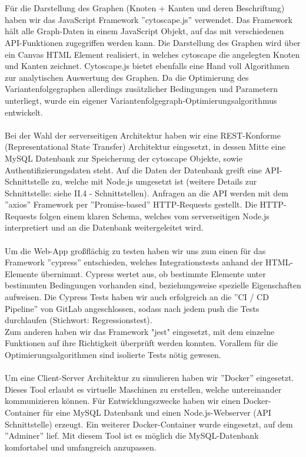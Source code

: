 \documentclass[twoside]{report}
\begin{document}
\\
\\Für die Darstellung des Graphen (Knoten + Kanten und deren Beschriftung) haben wir das JavaScript Framework ''cytoscape.js'' verwendet.
Das Framework hält alle Graph-Daten in einem JavaScript Objekt, auf das mit verschiedenen API-Funktionen zugegriffen werden kann.
Die Darstellung des Graphen wird über ein Canvas HTML Element realisiert, in welches cytoscape die angelegten Knoten und Kanten zeichnet.
Cytoscape.js bietet ebenfalls eine Hand voll Algorithmen zur analytischen Auswertung des Graphen. Da die Optimierung des Variantenfolgegraphen
allerdings zusätzlicher Bedingungen und Parametern unterliegt, wurde ein eigener Variantenfolgegraph-Optimierungsalgorithmus entwickelt.
\\
\\Bei der Wahl der serverseitigen Architektur haben wir eine REST-Konforme (Representational State Transfer)
Architektur eingesetzt, in dessen Mitte eine MySQL Datenbank zur Speicherung der cytoscape Objekte, sowie Authentifizierungsdaten
steht. Auf die Daten der Datenbank greift eine API-Schnittstelle zu, welche mit Node.js umgesetzt ist (weitere Details zur Schnittstelle:
siehe II.4 - Schnittstellen). Anfragen an die API werden mit dem ''axios'' Framework per ''Promise-based'' HTTP-Requests gestellt. Die HTTP-Requests
folgen einem klaren Schema, welches vom serverseitigen Node.js interpretiert und an die Datenbank weitergeleitet wird.
\\
\\Um die Web-App großflächig zu testen haben wir uns zum einen für das Framework ''cypress'' entschieden, welches Integrationstests anhand der
HTML-Elemente übernimmt. Cypress wertet aus, ob bestimmte Elemente unter bestimmten Bedingungen vorhanden sind, beziehungsweise spezielle 
Eigenschaften aufweisen. Die Cypress Tests haben wir auch erfolgreich an die ''CI / CD Pipeline'' von GitLab angeschlossen, sodass nach jedem
push die Tests durchlaufen (Stichwort: Regressionstest).
\\Zum anderen haben wir das Framework "jest" eingesetzt, mit dem einzelne Funktionen auf ihre Richtigkeit überprüft werden konnten. Vorallem
für die Optimierungsalgorithmen sind isolierte Tests nötig gewesen.
\\
\\Um eine Client-Server Architektur zu simulieren haben wir ''Docker'' eingesetzt. Dieses Tool erlaubt es virtuelle Maschinen zu erstellen,
welche untereinander kommunizieren können. Für Entwicklungszwecke haben wir einen Docker-Container für eine MySQL Datenbank und 
einen Node.js-Webserver (API Schnittstelle) erzeugt. Ein weiterer Docker-Container wurde eingesetzt, auf dem ''Adminer'' lief. Mit diesem 
Tool ist es möglich die MySQL-Datenbank komfortabel und umfangreich anzupassen. 
\end{document}
